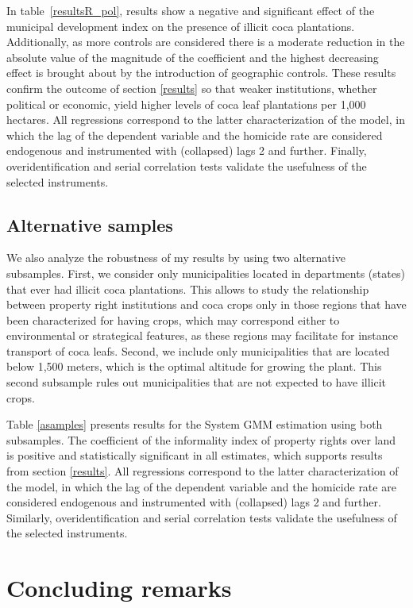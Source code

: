 In table~\ref{resultsR_pol}, results show a negative and significant effect of the municipal development index on the presence of illicit coca plantations. Additionally, as more controls are considered there is a moderate reduction in the absolute value of the magnitude of the coefficient and the highest decreasing effect is brought about by the introduction of geographic controls. These results confirm the outcome of section \ref{results} so that weaker institutions, whether political or economic, yield higher levels of coca leaf plantations per 1,000 hectares. All regressions correspond to the latter characterization of the model, in which the lag of the dependent variable and the homicide rate are considered endogenous and instrumented with (collapsed) lags 2 and further. Finally, overidentification and serial correlation tests validate the usefulness of the selected instruments.

\subsection{Alternative samples}

We also analyze the robustness of my results by using two alternative subsamples. First, we consider only municipalities located in departments (states) that ever had illicit coca plantations. This allows to study the relationship between property right institutions and coca crops only in those regions that have been characterized for having crops, which may correspond either to environmental or strategical features, as these regions may facilitate for instance transport of coca leafs. Second, we include only municipalities that are located below 1,500 meters, which is the optimal altitude for growing the plant. This second subsample rules out municipalities that are not expected to have illicit crops.

Table \ref{asamples} presents results for the System GMM estimation using both subsamples. The coefficient of the informality index of property rights over land is positive and statistically significant in all estimates, which supports results from section \ref{results}. All regressions correspond to the latter characterization of the model, in which the lag of the dependent variable and the homicide rate are considered endogenous and instrumented with (collapsed) lags 2 and further. Similarly, overidentification and serial correlation tests validate the usefulness of the selected instruments.

\section{Concluding remarks}

